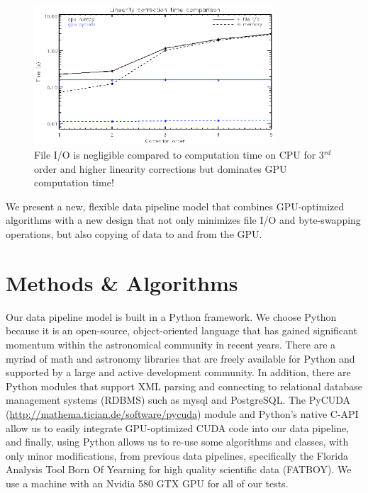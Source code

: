 \begin{figure}[!ht]
\includegraphics[width=0.8\textwidth]{part4/Warner_O31/O31_f1.eps}
\caption{File I/O is negligible compared to computation time on CPU for 3$^{rd}$ order and higher linearity corrections but dominates GPU computation time!}
\end{figure}

We present a new, flexible data pipeline model that combines GPU-optimized algorithms with a new design that not only minimizes file I/O and byte-swapping operations, but also copying of data to and from the GPU. 

\section{Methods \& Algorithms}

Our data pipeline model is built in a Python framework.  We choose Python because it is an open-source, object-oriented language that has gained significant momentum within the astronomical community in recent years. There are a myriad of math and astronomy libraries that are freely available for Python and supported by a large and active development community.  In addition, there are Python modules that support XML parsing and connecting to relational database management systems (RDBMS) such as mysql and PostgreSQL.  The PyCUDA (\url{http://mathema.tician.de/software/pycuda}) module and Python's native C-API allow us to easily integrate GPU-optimized CUDA code into our data pipeline, and finally, using Python allows us to re-use some algorithms and classes, with only minor modifications, from previous data pipelines, specifically the Florida Analysis Tool Born Of Yearning for high quality scientific data (FATBOY).  We use a machine with an Nvidia 580 GTX GPU for all of our tests.

